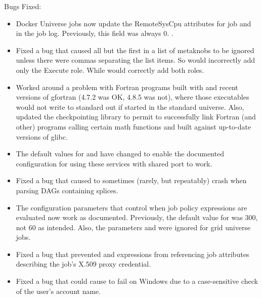 \noindent Bugs Fixed:

\begin{itemize}

\item Docker Universe jobs now update the RemoteSysCpu attributes for job
and in the job log.  Previously, this field was always 0.
.

\item Fixed a bug that caused all but the first in a list of metaknobs to be ignored
unless there were commas separating the list items. So 
would incorrectly add only the Execute role.
While  would correctly add both roles.

\item Worked around a problem with Fortran programs built with 
and recent versions of gfortran (4.7.2 was OK, 4.8.5 was not), where those
executables would not write to standard out if started in the standard universe.
Also, updated the checkpointing library to permit  to
successfully link Fortran (and other) programs calling certain math
functions and built against up-to-date versions of glibc.

\item The default values for  and
 have changed to enable the documented
configuration for using these services with shared port to work.

\item Fixed a bug that caused  to sometimes (rarely, but
repeatably) crash when parsing DAGs containing splices.

\item The configuration parameters that control when job policy expressions
are evaluated now work as documented.
Previously, the default value for  was
300, not 60 as intended.
Also, the parameters  and
 were ignored for grid universe jobs.

\item Fixed a bug that prevented  and
 expressions from referencing job attributes
describing the job's X.509 proxy credential.

\item Fixed a bug that could cause  to fail on
Windows due to a case-sensitive check of the user's account name.


\end{itemize}

